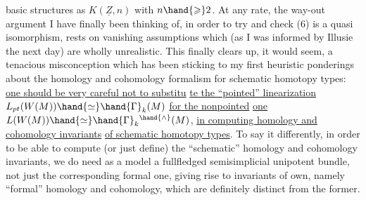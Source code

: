 
basic structures as $K(\underline{Z},n)$ with $n\hand{\geqslant} 2$. At any rate, the way-out argument
I have finally been thinking of, in order to try and check (6) is a quasi%
isomorphism, rests on vanishing assumptions which (as I was informed by
Illusie the next day) are wholly unrealistic. This finally clears up,
it would seem, a tenacious misconception which has been sticking to my
first heuristic ponderings about the homology and cohomology formalism
for schematic homotopy types: \uline{one should be very careful not to substitu}%
\uline{te the ``pointed'' linearization} $L_{pt}(W(M))\hand{\simeq}\hand{\Gamma}_k(M)$ \uline{for the nonpointed}
\uline{one} $L(W(M))\hand{\simeq}\hand{\Gamma}_k{}^{\hand{\wedge}}(M)$, \uline{in computing homology and cohomology invariants}
\uline{of schematic homotopy types}. To say it differently, in order to be
able to  compute (or just define) the ``schematic'' homology and
cohomology invariants, we do need as a model a fullfledged semisimplicial
unipotent bundle, not just the corresponding formal one, giving rise
to invariants of  own, namely ``formal'' homology and cohomology,
which are definitely distinct from the former.

